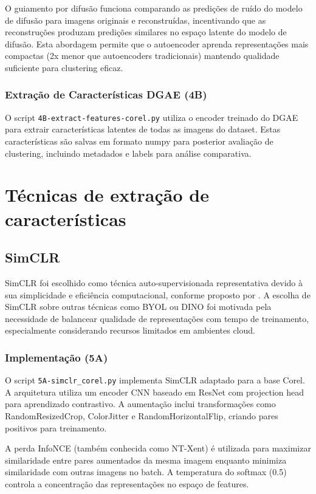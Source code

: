 O guiamento por difusão funciona comparando as predições de ruído do modelo de difusão para imagens originais e reconstruídas, incentivando que as reconstruções produzam predições similares no espaço latente do modelo de difusão. Esta abordagem permite que o autoencoder aprenda representações mais compactas (2x menor que autoencoders tradicionais) mantendo qualidade suficiente para clustering eficaz.

\subsubsection{Extração de Características DGAE (4B)}

O script \texttt{4B-extract-features-corel.py} utiliza o encoder treinado do DGAE para extrair características latentes de todas as imagens do dataset. Estas características são salvas em formato numpy para posterior avaliação de clustering, incluindo metadados e labels para análise comparativa.

\section{Técnicas de extração de características}

\subsection{SimCLR}

SimCLR foi escolhido como técnica auto-supervisionada representativa devido à sua simplicidade e eficiência computacional, conforme proposto por \cite{chen2020simclr}. A escolha de SimCLR sobre outras técnicas como BYOL ou DINO foi motivada pela necessidade de balancear qualidade de representações com tempo de treinamento, especialmente considerando recursos limitados em ambientes cloud.

\subsubsection{Implementação (5A)}

O script \texttt{5A-simclr\_corel.py} implementa SimCLR adaptado para a base Corel. A arquitetura utiliza um encoder CNN baseado em ResNet com projection head para aprendizado contrastivo. A aumentação inclui transformações como RandomResizedCrop, ColorJitter e RandomHorizontalFlip, criando pares positivos para treinamento.

A perda InfoNCE (também conhecida como NT-Xent) é utilizada para maximizar similaridade entre pares aumentados da mesma imagem enquanto minimiza similaridade com outras imagens no batch. A temperatura do softmax (0.5) controla a concentração das representações no espaço de features.

